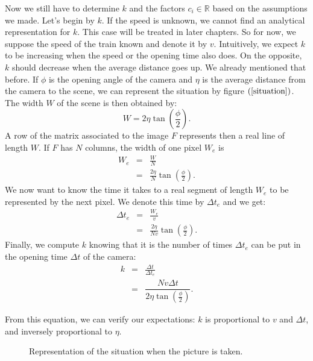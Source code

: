 Now we still have to determine $k$ and the factors $c_i \in \mathbb{R}$ based on the assumptions we made. Let's begin by $k$. If the speed is unknown, we cannot find an analytical representation for $k$. This case will be treated in later chapters. So for now, we suppose the speed of the train known and denote it by $v$. Intuitively, we expect $k$ to be increasing when the speed or the opening time also does. On the opposite, $k$ should decrease when the average distance goes up. We already mentioned that before. If $\phi$ is the opening angle of the camera and $\eta$ is the average distance from the camera to the scene, we can represent the situation by figure $(\ref{situation})$. The width $W$ of the scene is then obtained by: 
\begin{equation}
W = 2 \eta \tan\left(\frac{\phi}{2}\right).
\end{equation}
A row of the matrix associated to the image $F$ represents then a real line of length $W$. If $F$ has $N$ columns, the width of one pixel $W_e$ is
\begin{eqnarray}
W_e &=& \frac{W}{N} \\
&=& \frac{2 \eta }{N}\tan\left(\frac{\phi}{2}\right).
\end{eqnarray}
We now want to know the time it takes to a real segment of length $W_e$ to be represented by the next pixel. We denote this time by $\Delta t_e$ and we get:
\begin{eqnarray}
\Delta t_e &=&\frac{W_e}{v}\\
&=& \frac{2 \eta }{Nv}\tan\left(\frac{\phi}{2}\right).
\end{eqnarray}
Finally, we compute $k$ knowing that it is the number of times $\Delta t_e$ can be put in the opening time $\Delta t$ of the camera:
\begin{eqnarray}
k &=& \frac{\Delta t}{\Delta t _e} \\
&=& \dfrac{Nv\Delta t}{2 \eta \tan\left(\frac{\phi}{2}\right)}.
\end{eqnarray}

From this equation, we can verify our expectations: $k$ is proportional to $v$ and $\Delta t$, and inversely proportional to $\eta$.

\begin{figure}
\begin{center}
\end{center}
\caption{Representation of the situation when the picture is taken.}
\label{situation}
\end{figure}

